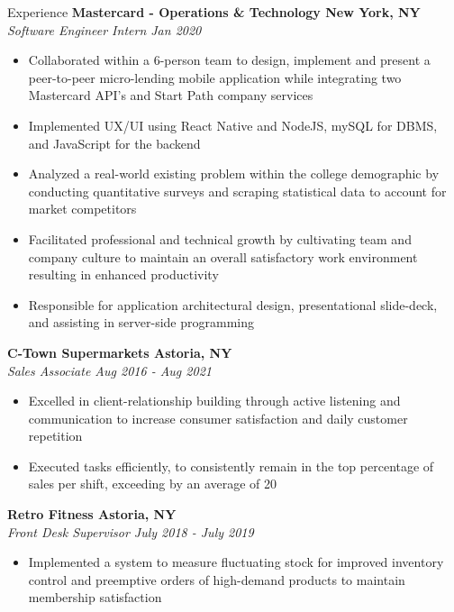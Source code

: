 \documentclass{resume}
\begin{document}
\begin{rSection}{Experience}
    {\bf Mastercard - Operations \& Technology \hfill New York, NY}  \\
    {\it Software Engineer Intern \hfill Jan 2020}
        \begin{itemize}
            \itemsep-0.6em
            \item Collaborated within a 6-person team to design, implement and present a peer-to-peer micro-lending mobile application while integrating two Mastercard API’s and Start Path company services 
            \item Implemented UX/UI using React Native and NodeJS, mySQL for DBMS, and JavaScript for the backend
            \item Analyzed a real-world existing problem within the college demographic by conducting quantitative surveys and scraping statistical data to account for market competitors 
            \item Facilitated professional and technical growth by cultivating team and company culture to maintain an overall satisfactory work environment resulting in enhanced productivity
            \item Responsible for application architectural design, presentational slide-deck, and assisting in server-side programming
        \end{itemize}
    {\bf C-Town Supermarkets \hfill  Astoria, NY} \\
    {\it Sales Associate \hfill Aug 2016 - Aug 2021}
        \begin{itemize}
            \itemsep-0.6em 
            \item Excelled in client-relationship building through active listening and communication to increase consumer satisfaction and daily customer repetition
            \item	Executed tasks efficiently, to consistently remain in the top percentage of sales per shift, exceeding by an average of 20%
        \end{itemize}
    {\bf Retro Fitness \hfill  Astoria, NY} \\
    {\it Front Desk Supervisor \hfill July 2018 - July 2019}
        \begin{itemize}
            \itemsep-0.6em 
            \item Implemented a system to measure fluctuating stock for improved inventory control and preemptive orders of high-demand products to maintain membership satisfaction
        \end{itemize}
\end{rSection}
\end{document}
